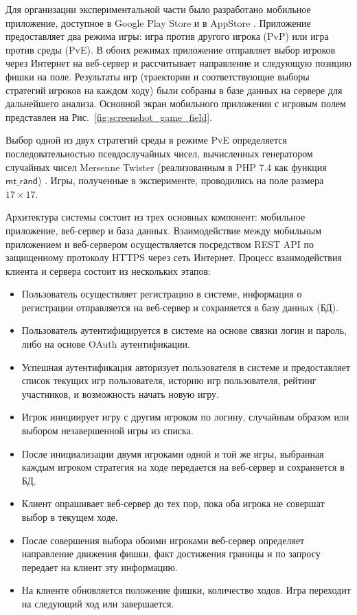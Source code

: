 Для организации экспериментальной части было разработано мобильное приложение, 
доступное в Google Play Store \cite{googleplay} и 
в AppStore \cite{applestore}. Приложение предоставляет два режима игры: 
игра против другого игрока (PvP) или игра против среды (PvE). В обоих режимах приложение отправляет выбор игроков 
через Интернет на веб-сервер и рассчитывает направление и следующую позицию фишки на поле. Результаты игр 
(траектории и соответствующие выборы стратегий игроков на каждом ходу) были собраны в базе данных на сервере для дальнейшего анализа.
Основной экран мобильного приложения с игровым полем представлен на Рис.~\cref{fig:screenshot_game_field}.

Выбор одной из двух стратегий среды в режиме PvE определяется последовательностью псевдослучайных чисел, 
вычисленных генератором случайных чисел Mersenne Twister (реализованным в PHP 7.4 как функция $\mathsf{mt\_rand}$) \cite{matsumoto_mersenne_1998}. 
Игры, полученные в эксперименте, проводились на поле размера $17 \times 17$.

Архитектура системы состоит из трех основных компонент: мобильное приложение, веб-сервер и база данных.
Взаимодействие между мобильным приложением и веб-сервером осуществляется посредством 
REST API по защищенному протоколу HTTPS через сеть Интернет. Процесс взаимодействия клиента и сервера состоит из нескольких этапов:
\begin{itemize}
\item Пользователь осуществляет регистрацию в системе, информация о регистрации отправляется на веб-сервер и сохраняется в базу данных (БД).
\item Пользователь аутентифицируется в системе на основе связки логин и пароль, либо на основе OAuth аутентификации.
\item Успешная аутентификация авторизует пользователя в системе и предоставляет список текущих игр пользователя, историю игр пользователя, рейтинг участников, и возможность начать новую игру.
\item Игрок инициирует игру с другим игроком по логину, случайным образом или выбором незавершенной игры из списка.
\item После инициализации двумя игроками одной и той же игры, выбранная каждым игроком стратегия на ходе передается на веб-сервер и сохраняется в БД.
\item Клиент опрашивает веб-сервер до тех пор, пока оба игрока не совершат выбор в текущем ходе.
\item После совершения выбора обоими игроками веб-сервер определяет направление движения фишки, факт достижения границы и по запросу передает на клиент эту информацию.
\item На клиенте обновляется положение фишки, количество ходов. Игра переходит на следующий ход или завершается.
\end{itemize}

